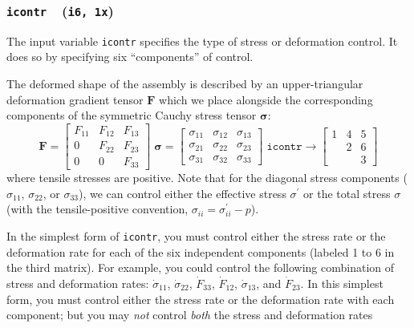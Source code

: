 \documentclass[letterpaper,11pt]{article}
\newcommand{\Var}[2]{\texttt{#1}\ \  (\texttt{#2})}
\begin{document}
\subsubsection[\texttt{icontr}]{\Var{icontr}{i6, 1x}}\label{sec:icontr}
The input variable \texttt{icontr} specifies the type of stress
or deformation control.
It does so by specifying six ``components'' of control.
\par
The deformed shape of the assembly is described by an
upper-triangular 
deformation gradient tensor
$\mathbf{F}$ which we place alongside the
corresponding components of the symmetric Cauchy stress tensor
$\mathbf{\sigma}$:
%
\begin{equation}
\mathbf{F} = \left[
\begin{array}{ccc}
F_{11} & F_{12} & F_{13} \\
  0    & F_{22} & F_{23} \\
  0    &   0    & F_{33}
\end{array}
\right]
\;
\mathbf{\sigma} = \left[
\begin{array}{ccc}
\sigma_{11} & \sigma_{12} & \sigma_{13} \\
\sigma_{21} & \sigma_{22} & \sigma_{23} \\
\sigma_{31} & \sigma_{32} & \sigma_{33} 
\end{array}
\right]
\;
\mathtt{icontr} \rightarrow \left[
\begin{array}{ccc}
1 & 4 & 5 \\
  & 2 & 6 \\
  &   & 3
\end{array}
\right]
\end{equation}
%
where tensile stresses are positive.
Note that for the diagonal stress components
($\sigma_{11}$, $\sigma_{22}$, or $\sigma_{33}$),
we can control either the effective stress $\sigma^{\prime}$ or the
total stress $\sigma$
(with the tensile-positive convention,
$\sigma_{ii} = \sigma^{\prime}_{ii} - p$).
%
\par
In the simplest form of \texttt{icontr},
you must control either the stress rate or the deformation rate
for each of the six independent components
(labeled 1 to 6 in the third matrix).
For example, you could control the following combination
of stress and deformation rates:
$\dot{\sigma}_{11}$, $\dot{\sigma}_{22}$,
$\dot{F}_{33}$, $\dot{F}_{12}$,
$\dot{\sigma}_{13}$, and $\dot{F}_{23}$.
In this simplest form,
you must control either the stress rate or the deformation rate with each
component; but
you may \emph{not} control \emph{both} the stress and deformation rates
\end{document}
